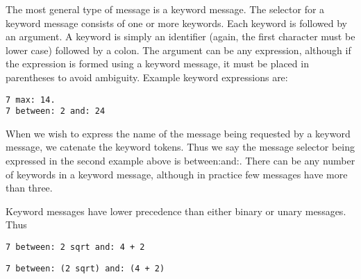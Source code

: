 The most general type of message is a keyword message. The selector
for a keyword message consists of one or more keywords. Each keyword
is followed by an argument. A keyword is simply an identifier (again, the
first character must be lower case) followed by a colon. The argument can
be any expression, although if the expression is formed using a keyword
message, it must be placed in parentheses to avoid ambiguity. Example
keyword expressions are:
\begin{lstlisting}
7 max: 14.
7 between: 2 and: 24
\end{lstlisting}

When we wish to express the name of the message being requested by
a keyword message, we catenate the keyword tokens. Thus we say the
message selector being expressed in the second example above is between:and:. There can be any number of keywords in a keyword message,
although in practice few messages have more than three.

Keyword messages have lower precedence than either binary or unary
messages. Thus
\begin{lstlisting}
7 between: 2 sqrt and: 4 + 2
\end{lstlisting}
\begin{lstlisting}
7 between: (2 sqrt) and: (4 + 2)
\end{lstlisting}
            